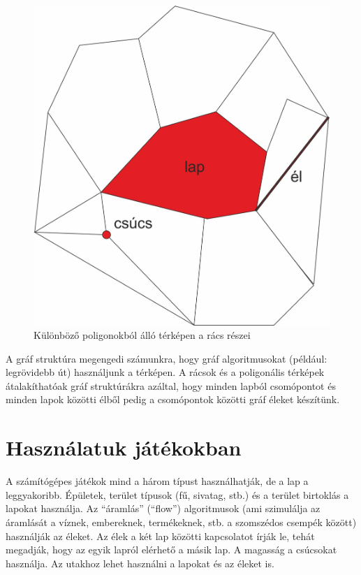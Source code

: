 \begin{figure}[h!]
\centering
\includegraphics[scale=0.4]{kepek/PartsOfGrid2.jpg}
\caption{Különböző poligonokból álló térképen a rács részei}
\label{fig:PartsOfGrid2}
\end{figure}

\noindent A gráf struktúra megengedi számunkra, hogy gráf algoritmusokat (például: legrövidebb út) használjunk a térképen. A rácsok és a poligonális térképek átalakíthatóak gráf struktúrákra azáltal, hogy minden lapból csomópontot és minden lapok közötti élből pedig a csomópontok közötti gráf éleket készítünk.

\section*{Használatuk játékokban}

A számítógépes játékok mind a három típust használhatják, de a lap a leggyakoribb. Épületek, terület típusok (fű, sivatag, stb.) és a terület birtoklás a lapokat használja. Az “áramlás” (“flow”) algoritmusok (ami szimulálja az áramlását a víznek, embereknek, termékeknek, stb. a szomszédos csempék között) használják az éleket. Az élek a két lap közötti kapcsolatot írják le, tehát megadják, hogy az egyik lapról elérhető a másik lap. A magasság a csúcsokat használja. Az utakhoz lehet használni a lapokat és az éleket is.